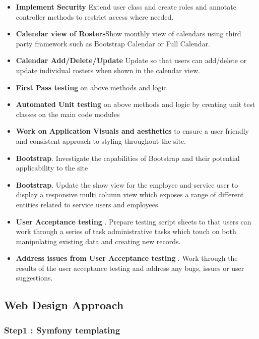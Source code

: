\documentclass[a4paper,Times New Roman 11pt]{article}
\begin{document}
\begin {itemize}
\item  \textbf{Implement Security} Extend user class and create roles and annotate controller methods to restrict access where needed.
\item  \textbf{Calendar view of Rosters}Show monthly view of calendars using third party framework such as Bootstrap Calendar or Full Calendar.
\item  \textbf{Calendar Add/Delete/Update }Update so that users can add/delete or update individual rosters when shown in the calendar view.
\item  \textbf{First Pass testing} on above methods and logic
\item  \textbf{Automated Unit testing} on above methods and logic by creating unit test classes on the main code modules
\item  \textbf{Work on Application Visuals and aesthetics} to ensure a user friendly and consistent approach to styling throughout the site.
\item  \textbf{Bootstrap}. Investigate the capabilities of Bootstrap and their potential applicability to the site
\item  \textbf{Bootstrap}. Update the show view for the employee and service user to display a responsive multi column view which exposes a range of different entities related to service users and employees.
\item  \textbf{User Acceptance testing }. Prepare testing script sheets to that users can work through a series of task administrative tasks which touch on both manipulating existing data and creating new records.
\item  \textbf{Address issues from User Acceptance testing }. Work through the results of the user acceptance testing and address any bugs, issues or user suggestions.
\end {itemize}

\subsection {Web Design Approach}

\subsubsection {Step1 : Symfony templating}
\end{document}

